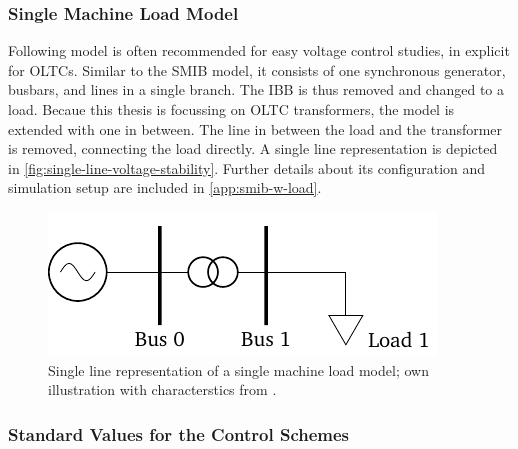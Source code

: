 \subsubsection{Single Machine Load Model}

Following model is often recommended \autocite{kundur_2022,machowski_2020} for easy voltage control studies, in explicit for \acsp{OLTC}. 
Similar to the \ac{SMIB} model, it consists of one synchronous generator, busbars, and lines in a single branch. 
The \acf{IBB} is thus removed and changed to a load. 
Becaue this thesis is focussing on \acs{OLTC} transformers, the model is extended with one in between. 
The line in between the load and the transformer is removed, connecting the load directly.
A single line representation is depicted in \autoref{fig:single-line-voltage-stability}.
Further details about its configuration and simulation setup are included in \autoref{app:smib-w-load}. 

\begin{figure}[htbp!]
    \centering
    \vspace{12pt}
    \includegraphics{tikz_graphics/images/sm_load_model.pdf}
    \vspace{12pt}
    \caption[Single line representation of a single machine load model]{Single line representation of a single machine load model; own illustration with characterstics from \autocite{kundur_2022}.}
    \label{fig:single-line-voltage-stability}
\end{figure}

\subsubsection{Standard Values for the Control Schemes}

